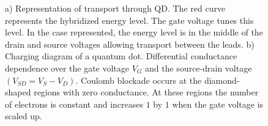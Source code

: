 \begin{figure}[t]
     \centering
    
     \caption{ a) Representation of transport through QD. The red curve represents the hybridized energy level. The gate voltage tunes this level. In the case represented, the energy level is in the middle of the drain and source voltages allowing transport between the leads. b) Charging diagram of a quantum dot. Differential conductance dependence over the gate voltage $V_G$ and the source-drain voltage $(V_{SD}=V_{S}-V_{D} )$. Coulomb blockade occurs at the diamond-shaped regions with zero conductance. At these regions the number of electrons is constant and increases $1$ by $1$ when the gate voltage is scaled up.  \protect{}}
\end{figure}

